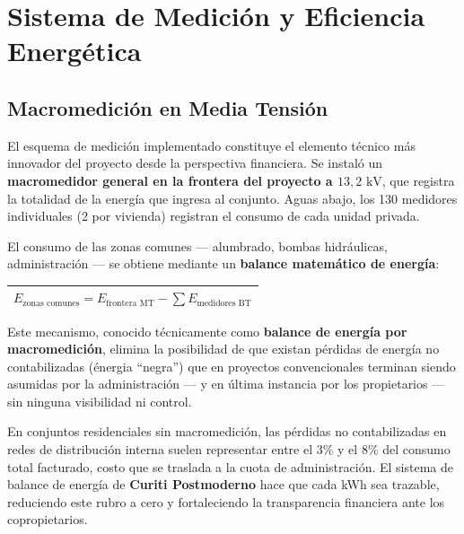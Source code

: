 \section{Sistema de Medici\'on y Eficiencia Energ\'etica}

\subsection{Macromedici\'on en Media Tensi\'on}

El esquema de medici\'on implementado constituye el elemento
t\'ecnico m\'as innovador del proyecto desde la perspectiva
financiera. Se instal\'o un \textbf{macromedidor general en
la frontera del proyecto a $13{,}2\text{ kV}$}, que registra
la totalidad de la energ\'ia que ingresa al conjunto.
Aguas abajo, los 130 medidores individuales (2 por vivienda)
registran el consumo de cada unidad privada.

El consumo de las zonas comunes --- alumbrado, bombas
hidr\'aulicas, administraci\'on --- se obtiene mediante un
\textbf{balance matem\'atico de energ\'ia}:

\vspace{4pt}
\begin{center}
\begin{tabular}{c}
  \toprule
  \large$E_{\text{zonas comunes}} =
    E_{\text{frontera MT}} -
    \displaystyle\sum E_{\text{medidores BT}}$ \\[6pt]
  \bottomrule
\end{tabular}
\end{center}
\vspace{4pt}

Este mecanismo, conocido t\'ecnicamente como
\textbf{balance de energ\'ia por macromedici\'on}, elimina
la posibilidad de que existan p\'erdidas de energ\'ia
no contabilizadas (\'energia ``negra'') que en proyectos
convencionales terminan siendo asumidas por la
administraci\'on --- y en \'ultima instancia por los
propietarios --- sin ninguna visibilidad ni control.

\begin{insightbox}
En conjuntos residenciales sin macromedici\'on, las p\'erdidas
no contabilizadas en redes de distribuci\'on interna suelen
representar entre el 3\% y el 8\% del consumo total facturado,
costo que se traslada a la cuota de administraci\'on. El sistema
de balance de energ\'ia de \textbf{Curiti Postmoderno}
hace que cada kWh sea trazable, reduciendo este rubro a cero
y fortaleciendo la transparencia financiera ante los copropietarios.
\end{insightbox}

